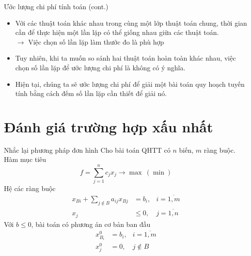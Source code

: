 \documentclass[10pt]{beamer}
\begin{document}
\begin{frame}{Ước lượng chi phí tính toán (cont.)}  
\begin{itemize}
\item Với các thuật toán khác nhau trong cùng một lớp thuật toán chung, thời gian cần để thực hiện một lần lặp có thể giống nhau giữa các thuật toán.\\
$\rightarrow$ Việc chọn số lần lặp làm thước đo là phù hợp
\item Tuy nhiên, khi ta muốn so sánh hai thuật toán hoàn toàn khác nhau, việc chọn số lần lặp để ước lượng chi phí là không có ý nghĩa.
\item  Hiện tại, chúng ta sẽ ước lượng chi phí để giải một bài toán quy hoạch tuyến tính bằng cách đếm số lần lặp cần thiết để giải nó.
\end{itemize}
\end{frame}

\section{Đánh giá trường hợp xấu nhất}
\begin{frame}{Nhắc lại phương pháp đơn hình}
Cho bài toán QHTT có $n$ biến, $m$ ràng buộc.
Hàm mục tiêu
$$
f = \sum_{j=1}^{n}c_jx_j \rightarrow \max\ (\min)
$$
Hệ các ràng buộc
\begin{equation*}
\begin{aligned}
x_{Bi} + \sum_{j \notin B}a_{ij}x_{Bj} &= b_i, &i = \overline{1, m}\\
x_j &\leq 0, &j = \overline{1, n}
\end{aligned}
\end{equation*}
Với $b \leq 0$, bài toán có phương án cơ bản ban đầu
\begin{equation*}
\begin{aligned}
x_{B_i}^0 &= b_i, &i = \overline{1, m}\\
x_j^0 &= 0, &j \notin B
\end{aligned}
\end{equation*}
\end{frame}
\end{document}
